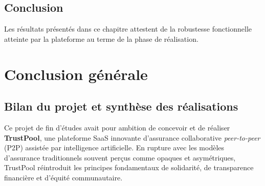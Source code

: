 \documentclass[12pt,a4paper]{report}
\begin{document}
\section{Conclusion}
Les résultats présentés dans ce chapitre attestent de la robustesse fonctionnelle atteinte par la plateforme au terme de la phase de réalisation.

\newpage

\chapter*{Conclusion générale}

\section*{Bilan du projet et synthèse des réalisations}
Ce projet de fin d'études avait pour ambition de concevoir et de réaliser \textbf{TrustPool}, une plateforme SaaS innovante d'assurance collaborative \textit{peer-to-peer} (P2P) assistée par intelligence artificielle. En rupture avec les modèles d'assurance traditionnels souvent perçus comme opaques et asymétriques, TrustPool réintroduit les principes fondamentaux de solidarité, de transparence financière et d'équité communautaire.
\end{document}
